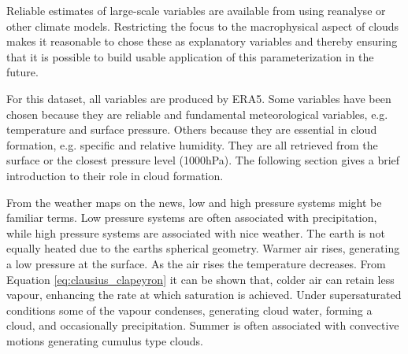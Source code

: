 Reliable estimates of large-scale variables are available from using reanalyse or other climate models. Restricting the focus to the macrophysical aspect of clouds  makes it reasonable to chose these as explanatory variables and thereby ensuring that it is possible to build usable application of this parameterization in the future.

For this dataset, all variables are produced by ERA5. Some variables have been chosen because they are reliable and fundamental meteorological variables, e.g. temperature and surface pressure. Others because they are essential in cloud formation, e.g. specific and relative humidity. They are all retrieved from the surface or the closest pressure level (1000hPa). The following section gives a brief introduction to their role in cloud formation. %

From the weather maps on the news, low and high pressure systems might be familiar terms. Low pressure systems are often associated with precipitation, while high pressure systems are associated with nice weather. The earth is not equally heated due to the earths spherical geometry. Warmer air rises, generating a low pressure at the surface. As the air rises the temperature decreases. From Equation \eqref{eq:clausius_clapeyron} it can be shown that, colder air can retain less vapour, enhancing the rate at which saturation is achieved. Under supersaturated conditions some of the vapour condenses, generating cloud water, forming a cloud, and occasionally precipitation. Summer is often associated with convective motions generating cumulus type clouds. %


